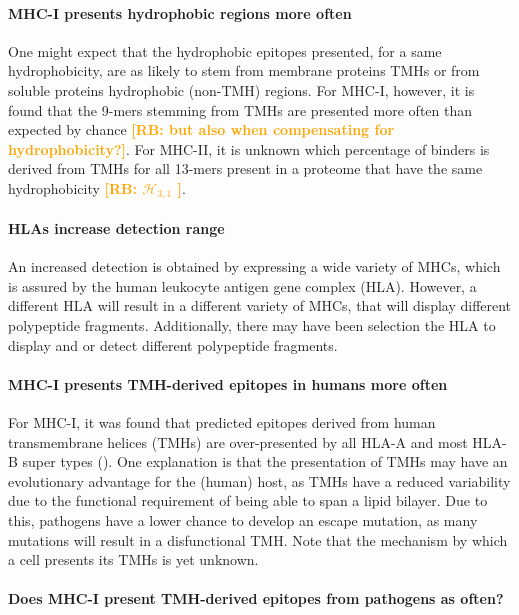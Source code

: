 \documentclass{article}
\newcommand{\richel}[1]{\textcolor{orange}{\textbf{[RB: #1]}}}
\begin{document}
\paragraph{MHC-I presents hydrophobic regions more often}

One might expect that the hydrophobic epitopes presented,
for a same hydrophobicity, are as likely to stem from 
membrane proteins TMHs or from soluble proteins hydrophobic (non-TMH) regions.
For MHC-I, however, it is found that the 9-mers stemming
from TMHs are presented more often than expected by 
chance \cite{bianchi2017}
\richel{but also when compensating for hydrophobicity?}.
For MHC-II, it is unknown which percentage of binders 
is derived from TMHs for all 13-mers present in a proteome
that have the same hydrophobicity 
\richel{
  $\mathcal{H}_{3,1}$
}.

\paragraph{HLAs increase detection range}

An increased detection
is obtained by expressing a wide variety of
MHCs, which is assured by the human leukocyte antigen gene complex (HLA).
However, a different HLA will result in a different variety of MHCs,
that will display different polypeptide fragments. Additionally, there
may have been selection the HLA to display and or detect different
polypeptide fragments.

\paragraph{MHC-I presents TMH-derived epitopes in humans more often}


For MHC-I, it was found that predicted epitopes derived 
from human transmembrane helices (TMHs)
are over-presented by all HLA-A and 
most HLA-B super types (\cite{bianchi2017}). 
One explanation is that the presentation of TMHs 
may have an evolutionary advantage for 
the (human) host, as TMHs have a reduced variability 
due to the functional requirement of being able to span a lipid 
bilayer. 
Due to this, pathogens have a lower chance to develop an escape mutation,
as many mutations will result in a disfunctional TMH.
Note that the mechanism by which a cell presents its TMHs is
yet unknown.

\paragraph{Does MHC-I present TMH-derived epitopes from pathogens as often?}
\end{document}
